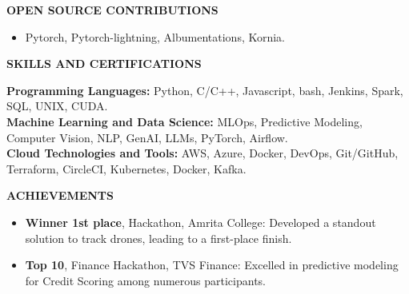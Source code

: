 \documentclass[10pt,a4]{article}
\begin{document}
{\begin{flushleft}
\end{flushleft}

\begin{flushleft}
    \textbf{\large OPEN SOURCE CONTRIBUTIONS}
    \begin{itemize}
        \item Pytorch, Pytorch-lightning, Albumentations, Kornia.
    \end{itemize}
\end{flushleft}



\begin{flushleft}
    {\large \textbf {SKILLS AND CERTIFICATIONS}}
    
        \vspace{1mm}
            \hspace{0.5cm}  \textbf{Programming Languages:} Python, C/C++, Javascript, bash, Jenkins, Spark, SQL, UNIX, CUDA. \\
            \hspace{0.5cm}  \textbf{Machine Learning and Data Science:} MLOps, Predictive Modeling, Computer Vision, NLP, GenAI, LLMs, PyTorch, Airflow. \\
            \hspace{0.5cm}  \textbf{Cloud Technologies and Tools:} AWS, Azure, Docker, DevOps, Git/GitHub, Terraform, CircleCI, Kubernetes, Docker, Kafka. \\
        

\end{flushleft}


\begin{flushleft}
        {\Large \textbf{ACHIEVEMENTS}}
        \vspace{1.5mm}
            \begin{itemize}
            \item \textbf{Winner 1st place}, Hackathon, Amrita College: Developed a standout solution to track drones, leading to a first-place finish.
            \item \textbf{Top 10}, Finance Hackathon, TVS Finance: Excelled in predictive modeling for Credit Scoring among numerous participants.
            \end{itemize}
        

\end{flushleft}}
\end{document}
